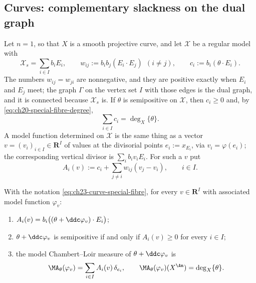 \subsection{Curves: complementary slackness on the dual graph}
\label{sec:ch23-curve-orthogonality}

Let $n=1$, so that $X$ is a smooth projective curve, and let
$\mathcal X$ be a regular model with
\begin{equation}\label{eq:ch23-curve-special-fibre}
 \mathcal X_s=\sum_{i\in I}b_iE_i,
 \qquad
 w_{ij}:=b_ib_j(E_i\cdot E_j)\ \ (i\ne j),
 \qquad
 c_i:=b_i(\theta\cdot E_i).
\end{equation}
The numbers $w_{ij}=w_{ji}$ are nonnegative, and they are positive exactly
when $E_i$ and $E_j$ meet; the graph $\Gamma$ on the vertex set $I$
with those edges is the dual graph, and it is connected because
$\mathcal X_s$ is.  If $\theta$ is semipositive on $\mathcal X$, then
$c_i\geq0$ and, by \eqref{eq:ch20-special-fibre-degree},
\begin{equation}\label{eq:ch23-curve-degree-sum}
 \sum_{i\in I}c_i=\deg_X\{\theta\} .
\end{equation}
A model function determined on $\mathcal X$ is the same thing as a vector
$v=(v_i)_{i\in I}\in\mathbf R^I$ of values at the divisorial points
$e_i:=x_{E_i}$, via $v_i=\varphi(e_i)$; the corresponding vertical
divisor is $\sum_ib_iv_iE_i$.  For such a $v$ put
\begin{equation}\label{eq:ch23-curve-residual-degree}
 A_i(v):=c_i+\sum_{j\ne i}w_{ij}(v_j-v_i),
 \qquad i\in I .
\end{equation}

\begin{lemma}
\label{lem:ch23-curve-residual-degree}
With the notation \eqref{eq:ch23-curve-special-fibre}, for every
$v\in\mathbf R^I$ with associated model function $\varphi_v$:
\begin{enumerate}
\item $A_i(v)=b_i\bigl((\theta+\ddc\varphi_v)\cdot E_i\bigr)$;
\item $\theta+\ddc\varphi_v$ is semipositive if and only if
$A_i(v)\geq0$ for every $i\in I$;
\item the model Chambert--Loir measure of $\theta+\ddc\varphi_v$ is
\begin{equation}\label{eq:ch23-curve-model-measure}
 \MA_\theta(\varphi_v)=\sum_{i\in I}A_i(v)\,\delta_{e_i},
 \qquad
 \MA_\theta(\varphi_v)(X^{\An})=\deg_X\{\theta\} .
\end{equation}
\end{enumerate}
\end{lemma}

